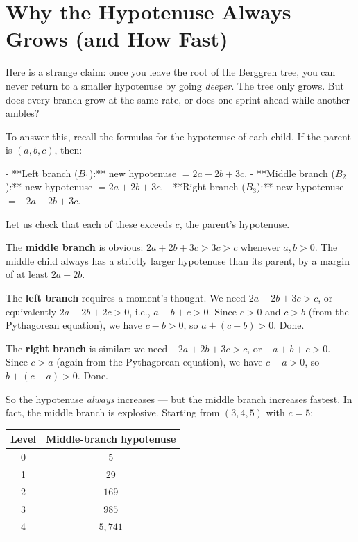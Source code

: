 \bigskip

\section*{Why the Hypotenuse Always Grows (and How Fast)}

Here is a strange claim: once you leave the root of the Berggren tree, you can never return to a smaller hypotenuse by going \textit{deeper}. The tree only grows. But does every branch grow at the same rate, or does one sprint ahead while another ambles?

To answer this, recall the formulas for the hypotenuse of each child. If the parent is $(a, b, c)$, then:

- **Left branch ($B_1$):** new hypotenuse $= 2a - 2b + 3c$.
- **Middle branch ($B_2$):** new hypotenuse $= 2a + 2b + 3c$.
- **Right branch ($B_3$):** new hypotenuse $= -2a + 2b + 3c$.

Let us check that each of these exceeds $c$, the parent's hypotenuse.

The \textbf{middle branch} is obvious: $2a + 2b + 3c > 3c > c$ whenever $a, b > 0$. The middle child always has a strictly larger hypotenuse than its parent, by a margin of at least $2a + 2b$.

The \textbf{left branch} requires a moment's thought. We need $2a - 2b + 3c > c$, or equivalently $2a - 2b + 2c > 0$, i.e., $a - b + c > 0$. Since $c > 0$ and $c > b$ (from the Pythagorean equation), we have $c - b > 0$, so $a + (c - b) > 0$. Done.

The \textbf{right branch} is similar: we need $-2a + 2b + 3c > c$, or $-a + b + c > 0$. Since $c > a$ (again from the Pythagorean equation), we have $c - a > 0$, so $b + (c - a) > 0$. Done.

So the hypotenuse \textit{always} increases --- but the middle branch increases fastest. In fact, the middle branch is explosive. Starting from $(3, 4, 5)$ with $c = 5$:

\begin{center}
\small
\begin{tabular}{c c}
\toprule
Level & Middle-branch hypotenuse \\
\midrule
0 & $5$ \\
1 & $29$ \\
2 & $169$ \\
3 & $985$ \\
4 & $5{,}741$ \\
\bottomrule
\end{tabular}
\end{center}

